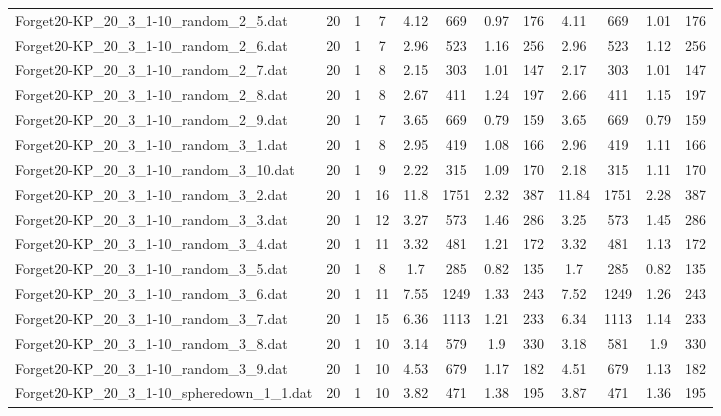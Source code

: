 \begin{sidewaystable}[!ht]
{\begin{tabular}{lccccccccccc}
Forget20-KP\_20\_3\_1-10\_random\_2\_5.dat & 20 & 1 & 7 & 4.12 & 669 & 0.97 & 176 & 4.11 & 669 & 1.01 & 176 \\
Forget20-KP\_20\_3\_1-10\_random\_2\_6.dat & 20 & 1 & 7 & 2.96 & 523 & 1.16 & 256 & 2.96 & 523 & 1.12 & 256 \\
Forget20-KP\_20\_3\_1-10\_random\_2\_7.dat & 20 & 1 & 8 & 2.15 & 303 & 1.01 & 147 & 2.17 & 303 & 1.01 & 147 \\
Forget20-KP\_20\_3\_1-10\_random\_2\_8.dat & 20 & 1 & 8 & 2.67 & 411 & 1.24 & 197 & 2.66 & 411 &  \textcolor{blue2}{1.15} & 197 \\
Forget20-KP\_20\_3\_1-10\_random\_2\_9.dat & 20 & 1 & 7 & 3.65 & 669 &  \textcolor{blue2}{0.79} & 159 & 3.65 & 669 &  \textcolor{blue2}{0.79} & 159 \\
Forget20-KP\_20\_3\_1-10\_random\_3\_1.dat & 20 & 1 & 8 & 2.95 & 419 & 1.08 & 166 & 2.96 & 419 & 1.11 & 166 \\
Forget20-KP\_20\_3\_1-10\_random\_3\_10.dat & 20 & 1 & 9 & 2.22 & 315 & 1.09 & 170 & 2.18 & 315 & 1.11 & 170 \\
Forget20-KP\_20\_3\_1-10\_random\_3\_2.dat & 20 & 1 & 16 & 11.8 & 1751 & 2.32 & 387 & 11.84 & 1751 &  \textcolor{blue2}{2.28} & 387 \\
Forget20-KP\_20\_3\_1-10\_random\_3\_3.dat & 20 & 1 & 12 & 3.27 & 573 & 1.46 & 286 & 3.25 & 573 & 1.45 & 286 \\
Forget20-KP\_20\_3\_1-10\_random\_3\_4.dat & 20 & 1 & 11 & 3.32 & 481 & 1.21 & 172 & 3.32 & 481 &  \textcolor{blue2}{1.13} & 172 \\
Forget20-KP\_20\_3\_1-10\_random\_3\_5.dat & 20 & 1 & 8 & 1.7 & 285 &  \textcolor{blue2}{0.82} & 135 & 1.7 & 285 &  \textcolor{blue2}{0.82} & 135 \\
Forget20-KP\_20\_3\_1-10\_random\_3\_6.dat & 20 & 1 & 11 & 7.55 & 1249 & 1.33 & 243 & 7.52 & 1249 &  \textcolor{blue2}{1.26} & 243 \\
Forget20-KP\_20\_3\_1-10\_random\_3\_7.dat & 20 & 1 & 15 & 6.36 & 1113 & 1.21 & 233 & 6.34 & 1113 &  \textcolor{blue2}{1.14} & 233 \\
Forget20-KP\_20\_3\_1-10\_random\_3\_8.dat & 20 & 1 & 10 & 3.14 & 579 &  \textcolor{blue2}{1.9} & 330 & 3.18 & 581 &  \textcolor{blue2}{1.9} & 330 \\
Forget20-KP\_20\_3\_1-10\_random\_3\_9.dat & 20 & 1 & 10 & 4.53 & 679 & 1.17 & 182 & 4.51 & 679 &  \textcolor{blue2}{1.13} & 182 \\
Forget20-KP\_20\_3\_1-10\_spheredown\_1\_1.dat & 20 & 1 & 10 & 3.82 & 471 & 1.38 & 195 & 3.87 & 471 &  \textcolor{blue2}{1.36} & 195 \\

\end{tabular}}
\end{sidewaystable}
